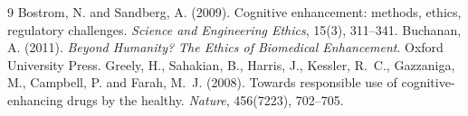 \documentclass{situationist-preprint}
\begin{document}
\begin{thebibliography}{9}\small
{} Bostrom, N. and Sandberg, A. (2009). Cognitive enhancement: methods, ethics, regulatory challenges. \emph{Science and Engineering Ethics}, 15(3), 311--341.
 Buchanan, A. (2011). \emph{Beyond Humanity? The Ethics of Biomedical Enhancement}. Oxford University Press.
 Greely, H., Sahakian, B., Harris, J., Kessler, R.~C., Gazzaniga, M., Campbell, P. and Farah, M.~J. (2008). Towards responsible use of cognitive-enhancing drugs by the healthy. \emph{Nature}, 456(7223), 702--705.
\end{thebibliography}
\end{document}
